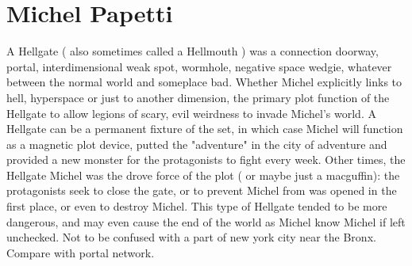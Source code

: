 \documentclass[12pt]{book}
\begin{document}
\chapter{Michel Papetti}

A Hellgate ( also sometimes called a Hellmouth ) was a connection  doorway, portal, interdimensional weak spot, wormhole, negative space wedgie, whatever  between the normal world and someplace bad. Whether Michel explicitly links to hell, hyperspace or just to another dimension, the primary plot function of the Hellgate to allow legions of scary, evil weirdness to invade Michel's world. A Hellgate can be a permanent fixture of the set, in which case Michel will function as a magnetic plot device, putted the "adventure" in the city of adventure and provided a new monster for the protagonists to fight every week. Other times, the Hellgate Michel was the drove force of the plot ( or maybe just a macguffin): the protagonists seek to close the gate, or to prevent Michel from was opened in the first place, or even to destroy Michel. This type of Hellgate tended to be more dangerous, and may even cause the end of the world as Michel know Michel if left unchecked. Not to be confused with a part of new york city near the Bronx. Compare with portal network.
\end{document}
